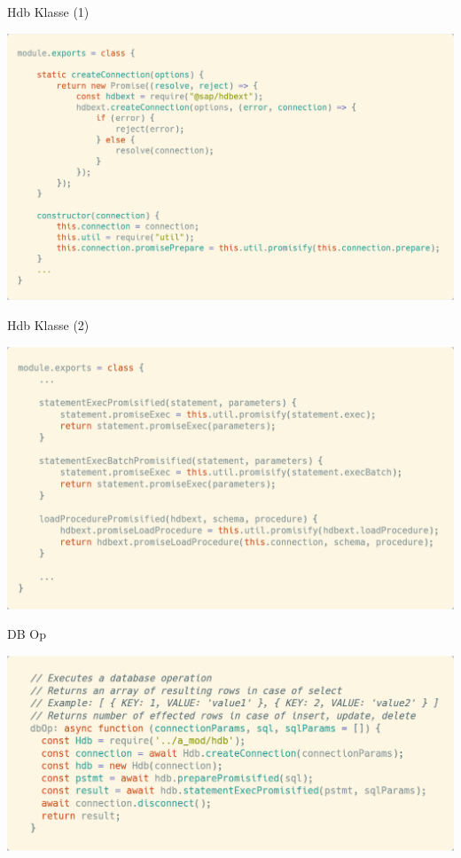 \documentclass[t,handout]{beamer}
\begin{document}
\begin{frame}{Hdb Klasse (1)}
  \begin{center}
    \includegraphics[scale=.22]{fig/hdb-class1.png}
  \end{center}
\end{frame}

\begin{frame}{Hdb Klasse (2)}
  \begin{center}
    \includegraphics[scale=.22]{fig/hdb-class2.png}
  \end{center}
\end{frame}

\begin{frame}{DB Op}
  \begin{center}
    \includegraphics[scale=.24]{fig/db-op.png}
  \end{center}
\end{frame}
\end{document}
